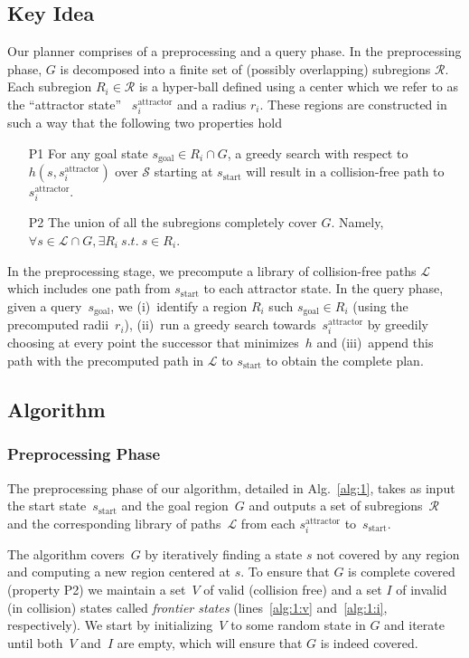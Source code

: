 \documentclass[letterpaper, 10 pt, conference]{ieeeconf}  %
\newcommand{\calL}{\ensuremath{\mathcal{L}}\xspace}
\newcommand{\calS}{\ensuremath{\mathcal{S}}\xspace}
\newcommand{\calR}{\ensuremath{\mathcal{R}}\xspace}
\newcommand{\sAttract}{\ensuremath{s^{\text{attractor}}_i}\xspace}
\newcommand{\sStart}{\ensuremath{s_{\text{start}}\xspace}}
\newcommand{\sGoal}{\ensuremath{s_{\text{goal}}\xspace}}
\begin{document}
\subsection{Key Idea}
Our planner comprises of a preprocessing and a query phase. 
In the preprocessing phase, $G$ is decomposed into a finite  set of (possibly overlapping) subregions $\calR$.
Each subregion $R_i \in \calR$ is a hyper-ball defined using a center which we refer to as the ``attractor state''~
\sAttract and a radius $r_i$.
These regions are constructed in such a way that the following two properties hold
\begin{enumerate}
  \item[P1] For any goal state $s_{\text{goal}} \in R_i \cap G$, a greedy search with respect to $h(s, \sAttract)$ over $\calS$ starting at $\sStart$ will result in a collision-free path to \sAttract.
  \item[P2] The union of all the subregions completely cover $G$. 
  		Namely, $\forall s \in \calL \cap G, \exists R_i \ s.t. \ s \in R_i$.
\end{enumerate}

In the preprocessing stage, we precompute a library of collision-free paths $\calL$ which includes one path from $\sStart$ to each attractor state. 
In the query phase, given a query~\sGoal, we 
(i)~identify a region $R_i$ such $\sGoal \in R_i$ (using the precomputed radii~$r_i$),
(ii)~run a greedy search towards~\sAttract by greedily choosing at every point the successor that minimizes~$h$ and
(iii)~append this path with the precomputed path in $\calL$ to $\sStart$ to obtain the complete plan.

\subsection {Algorithm}
\subsubsection{Preprocessing Phase}
The preprocessing phase of our algorithm, detailed in Alg.~\ref{alg:1}, takes as input the start state~$\sStart$ and the goal region~$G$ and outputs a set of subregions~$\calR$ and the corresponding library of paths~$\calL$ from each \sAttract to~\sStart. 

The algorithm covers~$G$ by iteratively finding a state $s$ not covered by any region and computing a new region centered at $s$.
To ensure that $G$ is complete covered (property P2) we maintain a set~$V$ of valid (collision free) and a set $I$ of invalid (in collision) states called \emph{frontier states} (lines~\ref{alg:1:v} and~\ref{alg:1:i}, respectively).
We start by initializing~$V$ to some random state in $G$ and iterate until both~$V$ and~$I$ are empty, which will ensure that $G$ is indeed covered.
\end{document}
